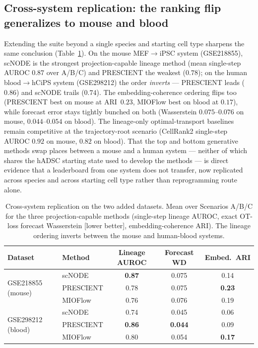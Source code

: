 \documentclass[11pt]{article}
\begin{document}
\subsection{Cross-system replication: the ranking flip generalizes to mouse and blood}
Extending the suite beyond a single species and starting cell type sharpens the same
conclusion (Table~\ref{tab:crosssystem}). On the mouse MEF$\to$iPSC system (GSE218855),
scNODE is the strongest projection-capable lineage method (mean single-step AUROC
$0.87$ over A/B/C) and PRESCIENT the weakest ($0.78$); on the human blood$\to$hCiPS
system (GSE298212) the order \emph{inverts} --- PRESCIENT leads ($0.86$) and scNODE
trails ($0.74$). The embedding-coherence ordering flips too (PRESCIENT best on mouse at
ARI~$0.23$, MIOFlow best on blood at $0.17$), while forecast error stays tightly bunched
on both (Wasserstein $0.075$--$0.076$ on mouse, $0.044$--$0.054$ on blood). The
lineage-only optimal-transport baselines remain competitive at the trajectory-root
scenario (CellRank2 single-step AUROC $0.92$ on mouse, $0.82$ on blood). That the top
and bottom generative methods swap places between a mouse and a human system --- neither
of which shares the hADSC starting state used to develop the methods --- is direct
evidence that a leaderboard from one system does not transfer, now replicated across
species and across starting cell type rather than reprogramming route alone.

\begin{table}[ht]
\centering
\caption{Cross-system replication on the two added datasets. Mean over Scenarios A/B/C
for the three projection-capable methods (single-step lineage AUROC, exact OT-loss
forecast Wasserstein [lower better], embedding-coherence ARI). The lineage ordering
inverts between the mouse and human-blood systems.}
\label{tab:crosssystem}
\small
\begin{tabular}{l l c c c}
\toprule
Dataset & Method & Lineage AUROC & Forecast WD & Embed.\ ARI \\
\midrule
\multirow{3}{*}{GSE218855 (mouse)}
 & scNODE    & \textbf{0.87} & 0.075 & 0.14 \\
 & PRESCIENT & 0.78 & 0.075 & \textbf{0.23} \\
 & MIOFlow   & 0.76 & 0.076 & 0.19 \\
\midrule
\multirow{3}{*}{GSE298212 (blood)}
 & scNODE    & 0.74 & 0.045 & 0.06 \\
 & PRESCIENT & \textbf{0.86} & \textbf{0.044} & 0.09 \\
 & MIOFlow   & 0.80 & 0.054 & \textbf{0.17} \\
\bottomrule
\end{tabular}
\end{table}
\end{document}
